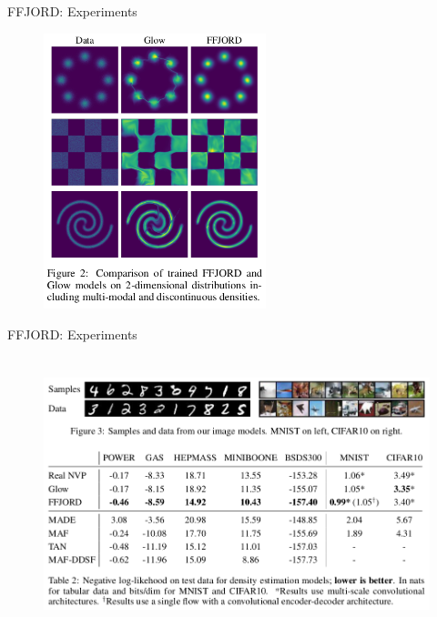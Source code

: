 \begin{frame}{FFJORD: Experiments}
\begin{figure}
    \centering
    \includegraphics[width=\textwidth,height=8cm, keepaspectratio]{images/ffjord_experiments1.png}
    \label{fig:ffjord_experiments1}
\end{figure}
\end{frame}
\begin{frame}{FFJORD: Experiments}
\begin{figure}
    \centering
    \includegraphics[width=\textwidth,height=8cm, keepaspectratio]{images/ffjord_experiments2.png}
    \label{fig:ffjord_experiments2}
\end{figure}
\end{frame}
